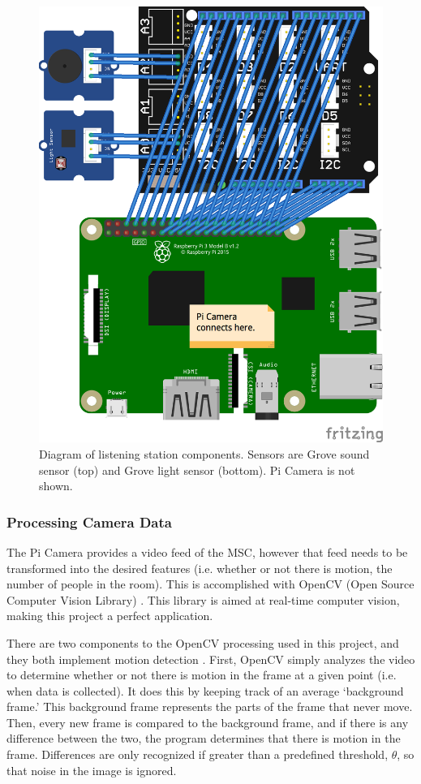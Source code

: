 \begin{figure}[t]
    \centering
    \includegraphics[width=0.97\linewidth]{figs/listening-station_bb.png}
    \caption{Diagram of listening station components. Sensors are Grove sound sensor (top) and Grove light sensor (bottom). Pi Camera is not shown.}
    \label{fig:breadboard}
\end{figure}

\subsubsection{Processing Camera Data}
The Pi Camera provides a video feed of the MSC, however that feed needs to be transformed into the desired features (i.e. whether or not there is motion, the number of people in the room). This is accomplished with OpenCV (Open Source Computer Vision Library) \cite{opencv}. This library is aimed at real-time computer vision, making this project a perfect application.

There are two components to the OpenCV processing used in this project, and they both implement motion detection \cite{motion}. First, OpenCV simply analyzes the video to determine whether or not there is motion in the frame at a given point (i.e. when data is collected). It does this by keeping track of an average `background frame.' This background frame represents the parts of the frame that never move. Then, every new frame is compared to the background frame, and if there is any difference between the two, the program determines that there is motion in the frame. Differences are only recognized if greater than a predefined threshold, $\theta$, so that noise in the image is ignored.

